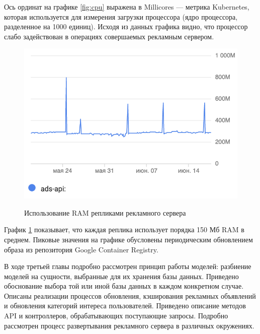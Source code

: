 \documentclass[specification,annotation,times]{itmo-student-thesis}
\begin{document}
Ось ординат на графике \ref{fig:cpu} выражена в Millicores  — метрика Kubernetes, которая используется для измерения загрузки процессора (ядро процессора, разделенное на 1000 единиц). Исходя из данных графика видно, что процессор слабо задействован в операциях совершаемых рекламным сервером. 

\begin{figure}[!h]
\caption{Использование RAM репликами рекламного сервера}
\includegraphics[height=0.2\paperheight]{ram}
\centering
\label{fig:ram}
\end{figure}
График \ref{fig:ram} показывает, что каждая реплика использует порядка 150 Мб RAM в среднем. Пиковые значения на графике обусловены периодическим обновлением образа из репозитория Google Container Registry.





\chapterconclusion

В ходе третьей главы подробно рассмотрен принцип работы моделей: разбиение моделей на сущности, выбранные для их хранения базы данных. Приведено обоснование выбора той или иной базы данных в каждом конкретном случае. Описаны реализации процессов обновления, кэширования рекламных объявлений и обновления категорий интереса пользователей. Приведено описание методов API и контроллеров, обрабатывающих поступающие запросы. Подробно рассмотрен процесс развертывания рекламного сервера в различных окружениях.
\end{document}
